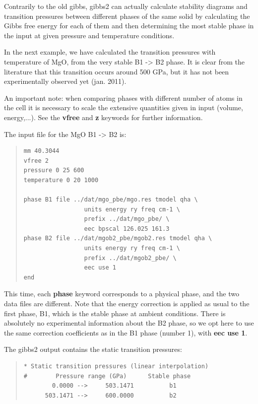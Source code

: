 \documentclass[a4paper]{article}
\begin{document}
Contrarily to the old gibbs, gibbs2 can actually calculate stability
diagrams and transition pressures between different phases of the same
solid by calculating the Gibbs free energy for each of them and then
determining the most stable phase in the input at given pressure and
temperature conditions.

In the next example, we have calculated the transition pressures with
temperature of MgO, from the very stable B1 -> B2 phase. It is clear
from the literature that this transition occurs around 500 GPa, but
it has not been experimentally observed yet (jan. 2011).

An important note: when comparing phases with different number of
atoms in the cell it is necessary to scale the extensive quantities
given in input (volume, energy,...). See the \textbf{vfree} and \textbf{z}
keywords for further information.

The input file for the MgO B1 -> B2 is:
%
\begin{quote}
\begin{verbatim}
mm 40.3044
vfree 2
pressure 0 25 600
temperature 0 20 1000

phase B1 file ../dat/mgo_pbe/mgo.res tmodel qha \
                 units energy ry freq cm-1 \
                 prefix ../dat/mgo_pbe/ \
                 eec bpscal 126.025 161.3
phase B2 file ../dat/mgob2_pbe/mgob2.res tmodel qha \
                 units energy ry freq cm-1 \
                 prefix ../dat/mgob2_pbe/ \
                 eec use 1
end
\end{verbatim}
\end{quote}

This time, each \textbf{phase} keyword corresponds to a physical phase, and
the two data files are different. Note that the energy correction is
applied as usual to the first phase, B1, which is the stable phase at
ambient conditions. There is absolutely no experimental information
about the B2 phase, so we opt here to use the same correction
coefficients as in the B1 phase (number 1), with \textbf{eec use 1}.

The gibbs2 output contains the static transition pressures:
%
\begin{quote}
\begin{verbatim}
* Static transition pressures (linear interpolation)
#        Pressure range (GPa)      Stable phase
        0.0000 -->     503.1471          b1
      503.1471 -->     600.0000          b2
\end{verbatim}
\end{quote}
\end{document}
